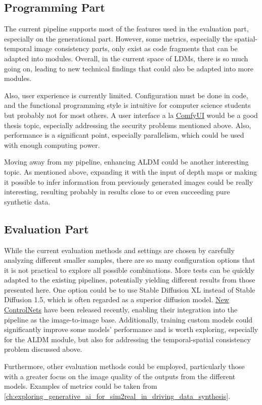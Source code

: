 \subsection{Programming Part}
The current pipeline supports most of the features used in the evaluation part, especially on the generational part. However, some metrics, especially the spatial-temporal image consistency parts, only exist as code fragments that can be adapted into modules. Overall, in the current space of LDMs, there is so much going on, leading to new technical findings that could also be adapted into more modules.

Also, user experience is currently limited. Configuration must be done in code, and the functional programming style is intuitive for computer science students but probably not for most others. A user interface a la \href{https://github.com/comfyanonymous/ComfyUI}{ComfyUI} would be a good thesis topic, especially addressing the security problems mentioned above. Also, performance is a significant point, especially parallelism, which could be used with enough computing power.

Moving away from my pipeline, enhancing ALDM could be another interesting topic. As mentioned above, expanding it with the input of depth maps or making it possible to infer information from previously generated images could be really interesting, resulting probably in results close to or even succeeding pure synthetic data.

\subsection{Evaluation Part}

While the current evaluation methods and settings are chosen by carefully analyzing different smaller samples, there are so many configuration options that it is not practical to explore all possible combinations. More tests can be quickly adapted to the existing pipelines, potentially yielding different results from those presented here. One option could be to use Stable Diffusion XL \cite{podell2023sdxlimprovinglatentdiffusion} instead of Stable Diffusion 1.5, which is often regarded as a superior diffusion model. \href{https://huggingface.co/docs/diffusers/v0.20.0/en/api/pipelines/controlnet_sdxl}{New ControlNets} have been released recently, enabling their integration into the pipeline as the image-to-image base. Additionally, training custom models could significantly improve some models' performance and is worth exploring, especially for the ALDM module, but also for addressing the temporal-spatial consistency problem discussed above.

Furthermore, other evaluation methods could be employed, particularly those with a greater focus on the image quality of the outputs from the different models. Examples of metrics could be taken from \autoref{ch:exploring_generative_ai_for_sim2real_in_driving_data_synthesis}.